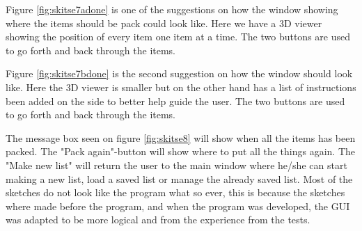 Figure \ref{fig:skitse7adone} is one of the suggestions on how the window showing where the items should be pack could look like. Here we have a 3D viewer showing the position of every item one item at a time. The two buttons are used to go forth and back through the items.


Figure \ref{fig:skitse7bdone} is the second suggestion on how the window should look like. Here the 3D viewer is smaller but on the other hand has a list of instructions been added on the side to better help guide the user. The two buttons are used to go forth and back through the items.


The message box seen on figure \ref{fig:skitse8} will show when all the items has been packed. The "Pack again"-button will show where to put all the things again. The "Make new list" will return the user to the main window where he/she can start making a new list, load a saved list or manage the already saved list. Most of the sketches do not look like the program what so ever, this is because the sketches where made before the program, and when the program was developed, the GUI was adapted to be more logical and from the experience from the tests.
